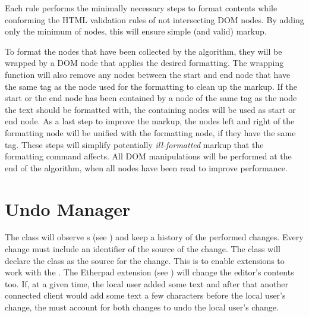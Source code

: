 Each rule performs the minimally necessary steps to format contents while conforming the HTML validation rules of not intersecting DOM nodes. By adding only the minimum of nodes, this will ensure simple (and valid) markup.

To format the nodes that have been collected by the algorithm, they will be wrapped by a DOM node that applies the desired formatting. The wrapping function will also remove any nodes between the start and end node that have the same tag as the node used for the formatting to clean up the markup. If the start or the end node has been contained by a node of the same tag as the node the text should be formatted with, the containing nodes will be used as start or end node. As a last step to improve the markup, the nodes left and right of the formatting node will be unified with the formatting node, if they have the same tag. These steps will simplify potentially \textit{ill-formatted} markup that the formatting command affects. All DOM manipulations will be performed at the end of the algorithm, when all nodes have been read to improve performance.







\section{Undo Manager}
\label{sec:undo_manager}

The  class will observe s (see ) and keep a history of the performed changes. Every change must include an identifier of the source of the change. The  class will declare the  class as the source for the change. This is to enable extensions to work with the . The Etherpad extension (see ) will change the editor's contents too. If, at a given time, the local user added some text and after that another connected client would add some text a few characters before the local user's change, the  must account for both changes to undo the local user's change.

